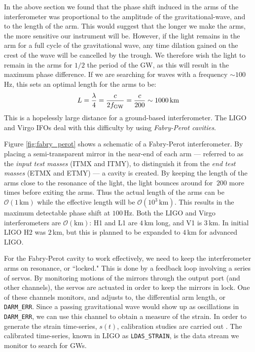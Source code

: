 In the above section we found that the phase shift induced in the arms of the interferometer was proportional to the amplitude of the gravitational-wave, and to the length of the arm. This would suggest that the longer we make the arms, the more sensitive our instrument will be. However, if the light remains in the arm for a full cycle of the gravitational wave, any time dilation gained on the crest of the wave will be cancelled by the trough. We therefore wish the light to remain in the arms for $1/2$ the period of the \ac{GW}, as this will result in the maximum phase difference. If we are searching for waves with a frequency $\sim 100\,$Hz, this sets an optimal length for the arms to be:
\begin{equation}
L = \frac{\lambda}{4} = \frac{c}{2f_{\mathrm{GW}}} = \frac{c}{200} \sim 1000\,\mathrm{km}
\end{equation}
This is a hopelessly large distance for a ground-based interferometer. The LIGO and Virgo \acp{IFO} deal with this difficulty by using \emph{Fabry-Perot cavities}.

Figure \ref{fig:fabry_perot} shows a schematic of a Fabry-Perot interferometer. By placing a semi-transparent mirror in the near-end of each arm --- referred to as the \emph{input test masses} (ITMX and ITMY), to distinguish it from the \emph{end test masses} (ETMX and ETMY) --- a cavity is created. By keeping the length of the arms close to the resonance of the light, the light bounces around for $~200$ more times \cite{Brown} before exiting the arms. Thus the actual length of the arms can be $\mathcal{O}(1\,\mathrm{km})$ while the effective length will be $\mathcal{O}(10^3\,\mathrm{km})$. This results in the maximum detectable phase shift at $100\,$Hz. Both the \ac{LIGO} and Virgo interferometers are $\mathcal{O}(\mathrm{km})$: H1 and L1 are $4\,$km long, and V1 is $3\,$km. In initial \ac{LIGO} H2 was $2\,$km, but this is planned to be expanded to $4\,$km for advanced \ac{LIGO}.

For the Fabry-Perot cavity to work effectively, we need to keep the interferometer arms on resonance, or ``locked." This is done by a feedback loop involving a series of servos. By monitoring motions of the mirrors through the output port (and other channels), the servos are actuated in order to keep the mirrors in lock. One of these channels monitors, and adjusts to, the differential arm length, or \verb|DARM_ERR|. Since a passing gravitational wave would show up as oscillations in \verb|DARM_ERR|, we can use this channel to obtain a measure of the strain. In order to generate the strain time-series, $s(t)$, calibration studies are carried out \cite{S5Calibration, BDCali, VirgoS2}. The calibrated time-series, known in \ac{LIGO} as \verb|LDAS_STRAIN|, is the data stream we monitor to search for \acp{GW}.

